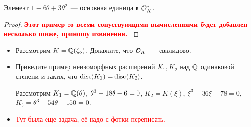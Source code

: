 	\begin{statement} 
		Элемент $1 - 6\theta + 3\theta^2$~--- основная единица в $\mathcal{O}_{K}^*$.
	\end{statement}
		
	\begin{proof}
		\bf{\textcolor{red}{Этот пример со всеми сопуствующими вычислениями будет добавлен несколько позже, приношу извинения. }}
	\end{proof}

	\begin{homework}
	\begin{itemize}
		\item Рассмотрим $K = \mathbb{Q}(\zeta_{5})$. Докажите, что $\mathcal{O}_{K}$~--- евклидово. 

		\item Приведите пример неизоморфных расширений $K_1, K_2$ над $\mathbb{Q}$ одинаковой степени и таких, что $\operatorname{disc}(K_1) = \operatorname{disc}(K_2)$.

		Рассмотрим $K_1 = \mathbb{Q}(\theta), \ \theta^3 - 18\theta - 6 = 0$, $K_2 = K(\xi), \ \xi^3 - 36\xi - 78 = 0$, $K_3 = \theta^3 - 54\theta - 150 = 0$.

		\item \textcolor{red}{Тут была еще задача, её надо с фотки переписать.} 
	\end{itemize}
	\end{homework}




